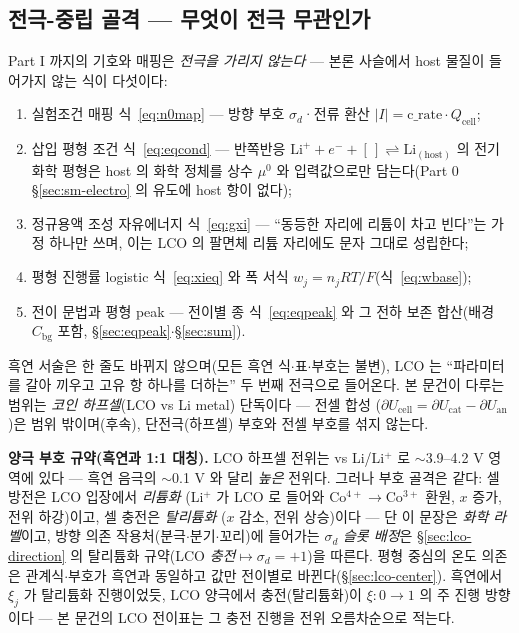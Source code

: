 \documentclass[11pt,a4paper]{article}
\newcommand{\cell}{\mathrm{cell}}
\newcommand{\bg}{\mathrm{bg}}
\begin{document}
\subsection{전극-중립 골격 --- 무엇이 전극 무관인가}\label{sec:lco-map}
Part I 까지의 기호와 매핑은 \emph{전극을 가리지 않는다} --- 본론 사슬에서 host 물질이 들어가지 않는 식이
다섯이다:
\begin{enumerate}[label=(\arabic*),leftmargin=2.2em,itemsep=1pt]
\item 실험조건 매핑 식~\eqref{eq:n0map} --- 방향 부호 $\sigma_d$·전류 환산 $|I|=\text{c\_rate}\cdot Q_\cell$;
\item 삽입 평형 조건 식~\eqref{eq:eqcond} --- 반쪽반응
$\mathrm{Li}^++e^-+[\,]\rightleftharpoons\mathrm{Li}_{(\mathrm{host})}$ 의 전기화학 평형은 host 의 화학
정체를 상수 $\mu^0$ 와 입력값으로만 담는다(Part 0 \S\ref{sec:sm-electro} 의 유도에 host 항이 없다);
\item 정규용액 조성 자유에너지 식~\eqref{eq:gxi} --- ``동등한 자리에 리튬이 차고 빈다''는 가정 하나만 쓰며,
이는 LCO 의 팔면체 리튬 자리에도 문자 그대로 성립한다;
\item 평형 진행률 logistic 식~\eqref{eq:xieq} 와 폭 서식 $w_j=n_jRT/F$(식~\eqref{eq:wbase});
\item 전이 문법과 평형 peak --- 전이별 종 식~\eqref{eq:eqpeak} 와 그 전하 보존 합산(배경 $C_\bg$ 포함,
\S\ref{sec:eqpeak}$\cdot$\S\ref{sec:sum}).
\end{enumerate}
흑연 서술은 한 줄도 바뀌지 않으며(모든 흑연
식$\cdot$표$\cdot$부호는 불변), LCO 는 ``파라미터를 갈아 끼우고 고유 항 하나를 더하는'' 두 번째 전극으로
들어온다. 본 문건이 다루는 범위는 \emph{코인 하프셀}(LCO vs Li metal) 단독이다 --- 전셀 합성
($\partial U_\cell=\partial U_\mathrm{cat}-\partial U_\mathrm{an}$)은 범위 밖이며(후속), 단전극(하프셀) 부호와 전셀
부호를 섞지 않는다.

\textbf{양극 부호 규약(흑연과 1:1 대칭).} LCO 하프셀 전위는 vs Li/Li$^+$ 로 $\sim$3.9--4.2 V 영역에 있다 — 흑연 음극의
$\sim$0.1 V 와 달리 \emph{높은} 전위다. 그러나 부호 골격은 같다: 셀 방전은 LCO 입장에서 \emph{리튬화}
(Li$^+$ 가 LCO 로 들어와 Co$^{4+}\!\to$Co$^{3+}$ 환원, $x$ 증가, 전위 하강)이고, 셀 충전은 \emph{탈리튬화}
($x$ 감소, 전위 상승)이다 — 단 이 문장은 \emph{화학 라벨}이고, 방향 의존 작용처(분극$\cdot$분기$\cdot$꼬리)에 들어가는
$\sigma_d$ \emph{슬롯 배정}은 \S\ref{sec:lco-direction} 의 탈리튬화 규약(LCO \emph{충전}$\mapsto\sigma_d{=}+1$)을
따른다. 평형 중심의 온도 의존은 관계식$\cdot$부호가 흑연과 동일하고 값만 전이별로 바뀐다(\S\ref{sec:lco-center}).
흑연에서 $\xi_j$ 가 탈리튬화 진행이었듯, LCO 양극에서 충전(탈리튬화)이 $\xi:0\!\to\!1$ 의 주 진행 방향이다 — 본 문건의
LCO 전이표는 그 충전 진행을 전위 오름차순으로 적는다.
\end{document}

